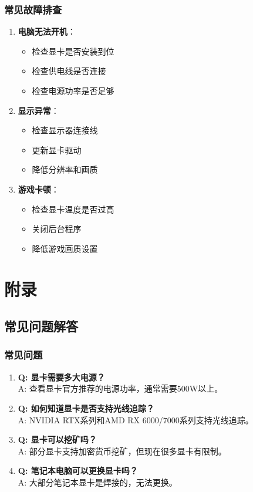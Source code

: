 \documentclass[12pt,UTF8]{ctexbook}
\begin{document}
\section{常见故障排查}

\begin{enumerate}
    \item \textbf{电脑无法开机}：
    \begin{itemize}[leftmargin=2em]
        \item 检查显卡是否安装到位
        \item 检查供电线是否连接
        \item 检查电源功率是否足够
    \end{itemize}
    
    \item \textbf{显示异常}：
    \begin{itemize}[leftmargin=2em]
        \item 检查显示器连接线
        \item 更新显卡驱动
        \item 降低分辨率和画质
    \end{itemize}
    
    \item \textbf{游戏卡顿}：
    \begin{itemize}[leftmargin=2em]
        \item 检查显卡温度是否过高
        \item 关闭后台程序
        \item 降低游戏画质设置
    \end{itemize}
\end{enumerate}

\part{附录}

\chapter{常见问题解答}

\section{常见问题}

\begin{enumerate}
    \item \textbf{Q: 显卡需要多大电源？}
    \\A: 查看显卡官方推荐的电源功率，通常需要500W以上。
    
    \item \textbf{Q: 如何知道显卡是否支持光线追踪？}
    \\A: NVIDIA RTX系列和AMD RX 6000/7000系列支持光线追踪。
    
    \item \textbf{Q: 显卡可以挖矿吗？}
    \\A: 部分显卡支持加密货币挖矿，但现在很多显卡有限制。
    
    \item \textbf{Q: 笔记本电脑可以更换显卡吗？}
    \\A: 大部分笔记本显卡是焊接的，无法更换。
\end{enumerate}
\end{document}
